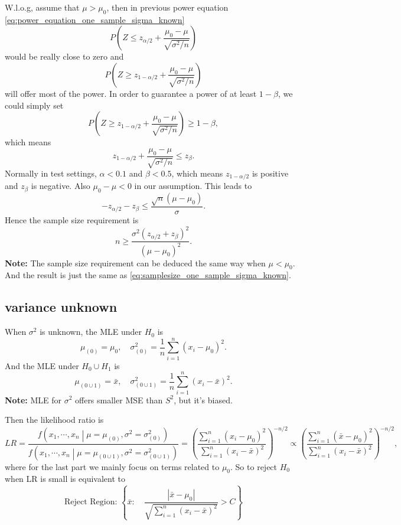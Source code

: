 \documentclass[a4paper,12pt]{article}
\begin{document}
W.l.o.g, assume that $\mu > \mu_0$, then in previous power equation \eqref{eq:power_equation_one_sample_sigma_known}
\[
  P\left(
    Z
    \leq z_{\alpha / 2}
    + \frac{\mu_0 - \mu}{\sqrt{\sigma^2 / n}}
  \right)
\]
would be really close to zero and
\[
  P\left(
    Z
    \geq z_{1 - \alpha / 2}
    + \frac{\mu_0 - \mu}{\sqrt{\sigma^2 / n}}
  \right) 
\]
will offer most of the power. In order to guarantee a power of at least $1 - \beta$, we could simply set
\[
    P\left(
    Z
    \geq z_{1 - \alpha / 2}
    + \frac{\mu_0 - \mu}{\sqrt{\sigma^2 / n}}
  \right) \geq 1 - \beta
  ,
\]
which means
\[
  z_{1 - \alpha / 2} + \frac{\mu_0 - \mu}{\sqrt{\sigma^2 / n}} \leq z_{\beta}
  .
\]
Normally in test settings, $\alpha < 0.1$ and $\beta < 0.5$, which means $z_{1 - \alpha / 2}$ is positive and $z_\beta$ is negative. Also $\mu_0 - \mu < 0$ in our assumption. This leads to
\[
  - z_{\alpha / 2} - z_{\beta} \leq \frac{\sqrt{n}\left(\mu - \mu_0\right)}{\sigma}
  .
\]
Hence the sample size requirement is
\begin{equation}
  \label{eq:samplesize_one_sample_sigma_known}
  n \geq \frac{\sigma^2\left(z_{\alpha / 2} + z_{\beta}\right)^2}{\left(\mu - \mu_0\right)^2}
  .  
\end{equation}
\textbf{Note:} The sample size requirement can be deduced the same way when $\mu < \mu_0$. And the result is just the same as \eqref{eq:samplesize_one_sample_sigma_known}.

\subsection{variance unknown}
\label{sec:variance-unknown}

When $\sigma^2$ is unknown, the MLE under $H_0$ is
\[
  \mu_{\left(0\right)} = \mu_0
  ,\quad
  \sigma^2_{\left(0\right)} = \frac{1}{n}\sum\limits_{i = 1}^n\left(x_i - \mu_0\right)^2
  .
\]
And the MLE under $H_0\cup H_1$ is
\[
  \mu_{\left(0 \cup 1\right)} = \bar{x}
  ,\quad
  \sigma^2_{\left(0 \cup 1\right)} = \frac{1}{n}\sum\limits_{i = 1}^n\left(x_i - \bar{x}\right)^2
  .
\]
\textbf{Note: } MLE for $\sigma^2$ offers smaller MSE than $S^2$, but it's biased.
\par
Then the likelihood ratio is
\[
  LR = \frac{
    f\left(x_1, \cdots, x_n\middle|\mu = \mu_{\left(0\right)}, \sigma^2 = \sigma^2_{\left(0\right)}\right)
  }{
    f\left(x_1, \cdots, x_n\middle|\mu = \mu_{\left(0\cup 1\right)}, \sigma^2 = \sigma^2_{\left(0\cup 1\right)}\right)
  }
  = \left(
    \frac{
      \sum\limits_{i = 1}^n\left(x_i - \mu_0\right)^2
    }{
      \sum\limits_{i = 1}^n\left(x_i - \bar{x}\right)^2
    }
  \right)^{-n / 2}
  \propto \left(
    \frac{
      \sum\limits_{i = 1}^n\left(\bar{x} - \mu_0\right)^2
    }{
      \sum\limits_{i = 1}^n\left(x_i - \bar{x}\right)^2
    }
  \right)^{-n / 2}  
  ,
\]
where for the last part we mainly focus on terms related to $\mu_0$. So to reject $H_0$ when LR is small is equivalent to
\[
  \text{Reject Region: }
  \left\{
    \bar{x}
    :\quad
    \frac{\left|\bar{x}-\mu_0\right|}{\sqrt{\sum\limits_{i = 1}^n\left(x_i - \bar{x}\right)^2}} > C
  \right\}
\]
\end{document}
